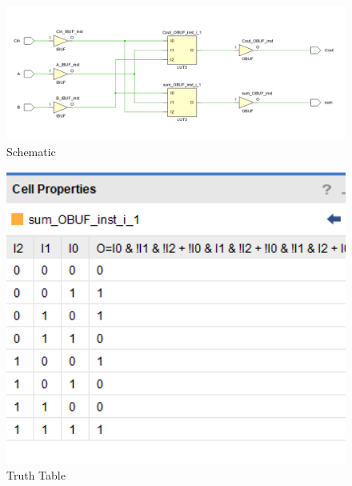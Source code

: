 \documentclass{article}
\begin{document}
\begin{figure}[h]
\begin{center}
\includegraphics[width=1\textwidth]{fullAdderSchematic.png} %
\caption{Schematic}
\end{center}
\end{figure}


\begin{figure}[h]
\begin{center}
\includegraphics[width=1\textwidth]{fullAdderTruthTable.png} %
\caption{Truth Table}
\end{center}
\end{figure}
\end{document}
